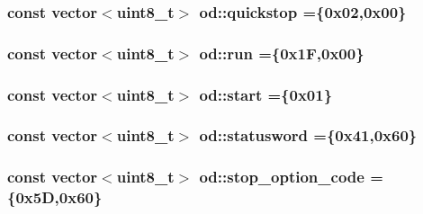 \subsubsection[{\texorpdfstring{quickstop}{quickstop}}]{\setlength{\rightskip}{0pt plus 5cm}const vector$<$uint8\+\_\+t$>$ od\+::quickstop =\{0x02,0x00\}}\hypertarget{namespaceod_a9afdc654634df7cc336d824c594d484a}{}\label{namespaceod_a9afdc654634df7cc336d824c594d484a}
\subsubsection[{\texorpdfstring{run}{run}}]{\setlength{\rightskip}{0pt plus 5cm}const vector$<$uint8\+\_\+t$>$ od\+::run =\{0x1\+F,0x00\}}\hypertarget{namespaceod_af47128107b86d08e437f81d48d20b05a}{}\label{namespaceod_af47128107b86d08e437f81d48d20b05a}
\subsubsection[{\texorpdfstring{start}{start}}]{\setlength{\rightskip}{0pt plus 5cm}const vector$<$uint8\+\_\+t$>$ od\+::start =\{0x01\}}\hypertarget{namespaceod_a5ca62a6451017dd2a0d53391d6fc5161}{}\label{namespaceod_a5ca62a6451017dd2a0d53391d6fc5161}
\subsubsection[{\texorpdfstring{statusword}{statusword}}]{\setlength{\rightskip}{0pt plus 5cm}const vector$<$uint8\+\_\+t$>$ od\+::statusword =\{0x41,0x60\}}\hypertarget{namespaceod_a7fe65fca00afb38d66fb49ec4fdc88c0}{}\label{namespaceod_a7fe65fca00afb38d66fb49ec4fdc88c0}
\subsubsection[{\texorpdfstring{stop\+\_\+option\+\_\+code}{stop_option_code}}]{\setlength{\rightskip}{0pt plus 5cm}const vector$<$uint8\+\_\+t$>$ od\+::stop\+\_\+option\+\_\+code =\{0x5\+D,0x60\}}\hypertarget{namespaceod_af1bc07726906ffc6ea25ab9abb478143}{}\label{namespaceod_af1bc07726906ffc6ea25ab9abb478143}
